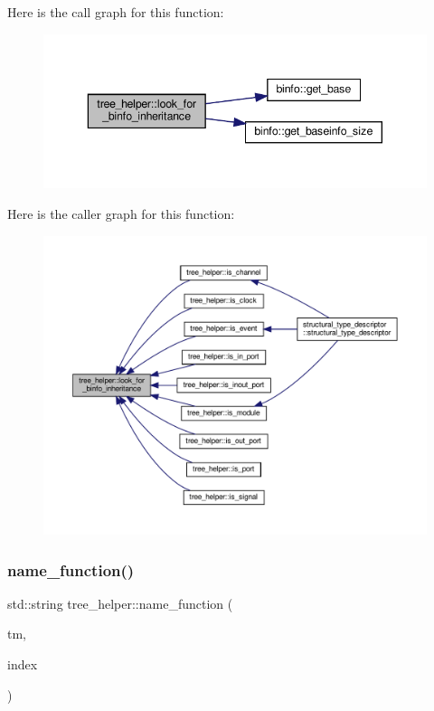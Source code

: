 Here is the call graph for this function\+:
\nopagebreak
\begin{figure}[H]
\begin{center}
\leavevmode
\includegraphics[width=343pt]{d7/d99/classtree__helper_aab7b2a970899a09142e98fa196d57ec5_cgraph}
\end{center}
\end{figure}
Here is the caller graph for this function\+:
\nopagebreak
\begin{figure}[H]
\begin{center}
\leavevmode
\includegraphics[width=350pt]{d7/d99/classtree__helper_aab7b2a970899a09142e98fa196d57ec5_icgraph}
\end{center}
\end{figure}
\mbox{\label{classtree__helper_a06ca465189be44d278bc027b82ea8e75}} 
\subsubsection{\texorpdfstring{name\+\_\+function()}{name\_function()}}
{\footnotesize\ttfamily std\+::string tree\+\_\+helper\+::name\+\_\+function (\begin{DoxyParamCaption}\item[{const \hyperlink{tree__manager_8hpp_a792e3f1f892d7d997a8d8a4a12e39346}{tree\+\_\+manager\+Const\+Ref}}]{tm,  }\item[{const unsigned int}]{index }\end{DoxyParamCaption})\hspace{0.3cm}{\ttfamily [static]}}



